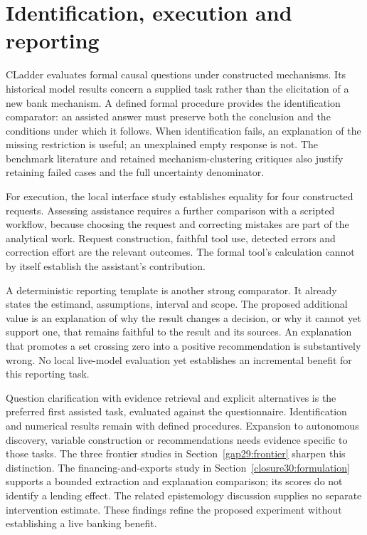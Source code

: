 \section{Identification, execution and reporting}
CLadder evaluates formal causal questions under constructed mechanisms. Its
historical model results concern a supplied task rather than the elicitation
of a new bank mechanism. A defined formal procedure provides the identification
comparator: an assisted answer must preserve both the conclusion and the
conditions under which it follows. When identification fails, an explanation
of the missing restriction is useful; an unexplained empty response is not.
The benchmark literature and retained mechanism-clustering critiques also
justify retaining failed cases and the full uncertainty denominator.
\citep{v12_la_2312_04350}

For execution, the local interface study establishes equality for four
constructed requests. Assessing assistance requires a further comparison with
a scripted workflow, because choosing the request and correcting mistakes are
part of the analytical work. Request construction, faithful tool use, detected
errors and correction effort are the relevant outcomes. The formal tool's
calculation cannot by itself establish the assistant's contribution.

A deterministic reporting template is another strong comparator. It already
states the estimand, assumptions, interval and scope. The proposed additional
value is an explanation of why the result changes a decision, or why it
cannot yet support one, that remains faithful to the result and its sources.
An explanation that promotes a set crossing zero into a positive recommendation
is substantively wrong. No local live-model evaluation yet establishes an
incremental benefit for this reporting task.

Question clarification with evidence retrieval and explicit alternatives is
the preferred first assisted task, evaluated against the questionnaire.
Identification and numerical results remain with defined procedures. Expansion
to autonomous discovery, variable construction or recommendations needs
evidence specific to those tasks. The three frontier studies in
Section~\ref{gap29:frontier} sharpen this distinction. The financing-and-exports
study in Section~\ref{closure30:formulation} supports a bounded extraction and
explanation comparison; its scores do not identify a lending effect. The
related epistemology discussion supplies no separate intervention estimate.
These findings refine the proposed experiment without establishing a live
banking benefit. \citep{rel18li,rel18mugleston}

